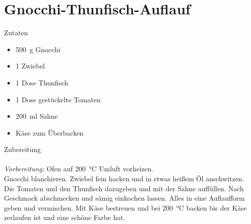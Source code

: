 \section*{Gnocchi-Thunfisch-Auflauf}
\ihead{}\ohead{}
\cfoot{}
{\Large Zutaten}
\begin{multicols}{2}
\begin{itemize}
    \item \SI{500}{g} Gnocchi
    \item \num{1} Zwiebel
    \item \num{1} Dose Thunfisch
    \item \num{1} Dose gestückelte Tomaten
    \item \SI{200}{ml} Sahne
    \item Käse zum Überbacken
\end{itemize}
\end{multicols}
\noindent
{\Large Zubereitung}\\
\\
\textit{Vorbereitung:} Ofen auf \SI{200}{\celsius} Umluft vorheizen.\\
Gnocchi blanchieren.
Zwiebel fein hacken und in etwas heißem Öl anschwitzen.
Die Tomaten und den Thunfisch dazugeben und mit der Sahne auffüllen.
Nach Geschmack abschmecken und sämig einkochen lassen.
Alles in eine Auflaufform geben und vermischen.
Mit Käse bestreuen und bei \SI{200}{\celsius} backen bis der Käse zerlaufen ist und eine schöne Farbe hat. 